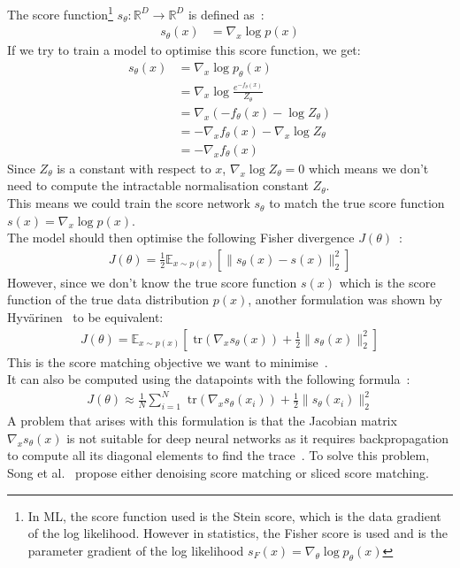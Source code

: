 \documentclass{article}
\numberwithin{equation}{section}
\numberwithin{figure}{section}
\begin{document}
The score function\footnote{In ML, the score function used is the Stein score, which is the data gradient of the log likelihood. However in statistics, the Fisher score is used and is the parameter gradient of the log likelihood $s_F (x) = \nabla_\theta \log p_\theta (x)$ } $s_\theta : \mathbb{R}^D \rightarrow \mathbb{R}^D$ is defined as~\cite{song2020generative}: 
\begin{align}
  s_\theta (x) &= \nabla_x \log p(x)
\end{align}
If we try to train a model to optimise this score function, we get:
\begin{align}
  s_\theta (x) &= \nabla_x \log p_\theta(x) \\
  &= \nabla_x \log \frac{e^{-f_\theta (x)}}{Z_\theta} \\
  &= \nabla_x \left( -f_\theta (x) - \log Z_\theta \right) \\
  &= - \nabla_x f_\theta (x) - \nabla_x \log Z_\theta \\
  &= - \nabla_x f_\theta (x)
\end{align}
Since $Z_\theta$ is a constant with respect to $x$, $\nabla_x \log Z_\theta = 0$ which means we don't need to compute the intractable normalisation constant $Z_\theta$. \\
This means we could train the score network $s_\theta$ to match the true score function $s(x) = \nabla_x \log p(x)$. \\
The model should then optimise the following Fisher divergence $J(\theta)$~\cite{hyvarinen2005, luo2022understanding}:
\begin{align}
  J(\theta) = \frac{1}{2} \mathbb{E}_{x \sim p(x)} \left[ \| s_\theta (x) - s(x) \|_2^2 \right]
\end{align}
However, since we don't know the true score function $s(x)$ which is the score function of the true data distribution $p(x)$, another formulation was shown by Hyvärinen~\cite{hyvarinen2005} to be equivalent: 
\begin{align}
  J(\theta) = \mathbb{E}_{x \sim p(x)} \left[ \text{ tr}(\nabla_x s_\theta (x)) + \frac{1}{2} \| s_\theta (x) \|_2^2 \right]
\end{align}
This is the score matching objective we want to minimise~\cite{hyvarinen2005}. \\
It can also be computed using the datapoints with the following formula~\cite{hyvarinen2005}:
\begin{align}
  J(\theta) \approx \frac{1}{N} \sum_{i=1}^N \text{ tr}(\nabla_x s_\theta (x_i)) + \frac{1}{2} \| s_\theta (x_i) \|_2^2
\end{align}
A problem that arises with this formulation is that the Jacobian matrix $\nabla_x s_\theta (x)$ is not suitable for deep neural networks as it requires backpropagation to compute all its diagonal elements to find the trace~\cite{song2020generative, song2019sliced}. To solve this problem, Song et al.~\cite{song2020generative} propose either denoising score matching or sliced score matching.
\end{document}
